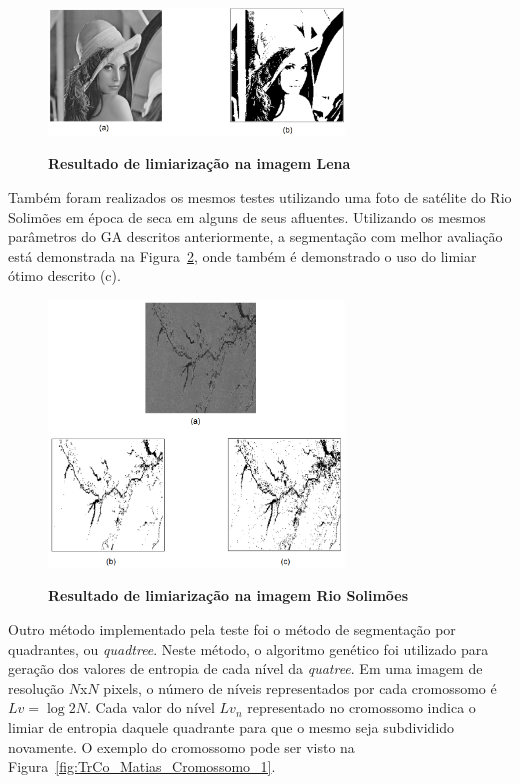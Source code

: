 \documentclass[12pt,oneside,a4paper,english,french,spanish,brazil,]{abntex2}
\begin{document}
\begin{figure}[ht]
\centering
\caption{\textbf{Resultado de limiarização na imagem Lena}}
\includegraphics[width=0.7\textwidth]{imagens/TrCo_Matias_Limiar_1.PNG}
\label{fig:TrCo_Matias_Limiar_1}
\end{figure}

Também foram realizados os mesmos testes utilizando uma foto de satélite do Rio Solimões em época de seca em alguns de seus afluentes. Utilizando os mesmos parâmetros do GA descritos anteriormente, a segmentação com melhor avaliação está demonstrada na Figura~\ref{fig:TrCo_Matias_Limiar_2}, onde também é demonstrado o uso do limiar ótimo descrito \cite{gonzalez:2012} (c).

\begin{figure}[ht]
\centering
\caption{\textbf{Resultado de limiarização na imagem Rio Solimões}}
\includegraphics[width=0.7\textwidth]{imagens/TrCo_Matias_Limiar_2.PNG}
\label{fig:TrCo_Matias_Limiar_2}
\end{figure}

Outro método implementado pela teste foi o método de segmentação por quadrantes, ou \textit{quadtree}. Neste método, o algoritmo genético foi utilizado para geração dos valores de entropia de cada nível da \textit{quatree}. Em uma imagem de resolução \(N\)x\(N\) pixels, o número de níveis representados por cada cromossomo é \(Lv=\log 2 N\). Cada valor do nível \(Lv_n\) representado no cromossomo indica o limiar de entropia daquele quadrante para que o mesmo seja subdividido novamente. O exemplo do cromossomo pode ser visto na Figura~\ref{fig:TrCo_Matias_Cromossomo_1}.
\end{document}
